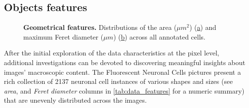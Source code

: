 \subsection{Objects features}
\begin{figure}
    \centering
    \caption{\textbf{Geometrical features.} Distributions of the area ($\mu m^2$) (\hyperref[fig:dataset:geom:area]{a}) and maximum Feret diameter ($\mu m$) (\hyperref[fig:dataset:geom:feret]{b}) across all annotated cells.}
    \label{fig:dataset:geom}
\end{figure}
After the initial exploration of the data characteristics at the pixel level, additional investigations can be devoted to discovering meaningful insights about images' macroscopic content.
The Fluorescent Neuronal Cells pictures present a rich collection of 2137 neuronal cell instances of various shapes and sizes (see \textit{area}, and \textit{Feret diameter} columns in \cref{tab:data_features} for a numeric summary) that are unevenly distributed across the images.

